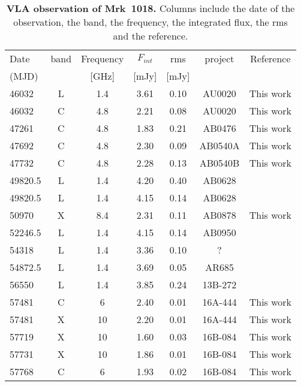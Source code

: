 \begin{table}
\centering
\caption{{\bf VLA observation of Mrk~1018.} Columns include the date of the observation, the band, the frequency, the integrated flux, the rms and the reference.}
\label{tab:tableradio}
\begin{tabular}{lcccccc}
\hline
\hline
 
 Date &   band  & Frequency  &$F_{int}$  &  rms & project & Reference  \\ 
 (MJD)&                   &   [GHz]   &[mJy]     &[mJy] &                    &            
 \\ \hline
46032 & L & 1.4 & 3.61 & 0.10 & AU0020 &  This work\\ 
46032 & C & 4.8 & 2.21 & 0.08 & AU0020 &  This work\\ 
47261 & C & 4.8 & 1.83 & 0.21 & AB0476 &  This work\\ 
47692 & C & 4.8 & 2.30 & 0.09 & AB0540A &  This work\\ 
47732 & C & 4.8 & 2.28 & 0.13 & AB0540B &  This work\\ 
49820.5 & L & 1.4 & 4.20 & 0.40 & AB0628 & \citet{1998AJ....115.1693C} \\ 
49820.5 & L & 1.4 & 4.15 & 0.14 & AB0628 & \citet{1997ApJ...475..479W} \\ 
50970 & X & 8.4 & 2.31 & 0.11 & AB0878 &  This work\\ 
52246.5 & L & 1.4 & 4.15 & 0.14 & AB0950 & \citet{2003yCat.8071....0B} \\ 
54318 & L & 1.4 & 3.36 & 0.10 & ? & \citet{2012yCat.8090....0B} \\ 
54872.5 & L & 1.4 & 3.69 & 0.05 & AR685 & \citet{2011AJ....142....3H} \\ 
56550 & L & 1.4 & 3.85 & 0.24 & 13B-272 & \citet{2016MNRAS.460.4433H} \\ 
57481 & C & 6 & 2.40 & 0.01 & 16A-444 &  This work\\ 
57481 & X & 10 & 2.20 & 0.01 & 16A-444 &  This work\\ 
57719 & X & 10 & 1.60 & 0.03 & 16B-084 &  This work\\ 
57731 & X & 10 & 1.86 & 0.01 & 16B-084 &  This work\\ 
57768 & C & 6 & 1.93 & 0.02 & 16B-084 &  This work\\ \hline 
\end{tabular}   
\end{table}



